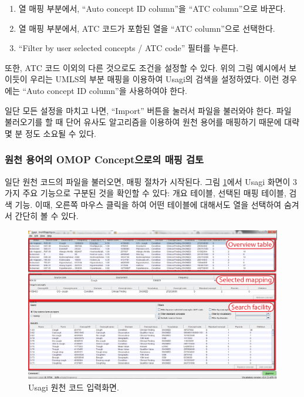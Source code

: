 \documentclass[10.5pt]{book}
\providecommand{\tightlist}{%
  \setlength{\itemsep}{0pt}\setlength{\parskip}{0pt}}
\theoremstyle{definition}
\theoremstyle{definition}
\theoremstyle{definition}
\theoremstyle{remark}
\begin{document}
\begin{enumerate}
\def\labelenumi{\arabic{enumi}.}
\tightlist
\item
  열 매핑 부분에서, ``Auto concept ID column''을 ``ATC column''으로
  바꾼다.
\item
  열 매핑 부분에서, ATC 코드가 포함된 열을 ``ATC column''으로 선택한다.
\item
  ``Filter by user selected concepts / ATC code'' 필터를 누른다.
\end{enumerate}

또한, ATC 코드 이외의 다른 것으로도 조건을 설정할 수 있다. 위의 그림
예시에서 보이듯이 우리는 UMLS의 부분 매핑을 이용하여 Usagi의 검색을
설정하였다. 이런 경우에는 ``Auto concept ID column''을 사용하여야 한다.

일단 모든 설정을 마치고 나면, ``Import'' 버튼을 눌러서 파일을 불러와야
한다. 파일 불러오기를 할 때 단어 유사도 알고리즘을 이용하여 원천 용어를
매핑하기 때문에 대략 몇 분 정도 소요될 수 있다.

\subsubsection*{원천 용어의 OMOP Concept으로의 매핑
검토}\label{--omop-concept--}

일단 원천 코드의 파일을 불러오면, 매핑 절차가 시작된다. 그림
\ref{fig:usagiOverview}에서 Usagi 화면이 3가지 주요 기능으로 구분된 것을
확인할 수 있다: 개요 테이블, 선택된 매핑 테이블, 검색 기능. 이때, 오른쪽
마우스 클릭을 하여 어떤 테이블에 대해서도 열을 선택하여 숨겨서 간단히 볼
수 있다.

\begin{figure}

{\centering \includegraphics[width=1\linewidth]{images/ExtractTransformLoad/usagiOverview} 

}

\caption{Usagi 원천 코드 입력화면.}\label{fig:usagiOverview}
\end{figure}
\end{document}
